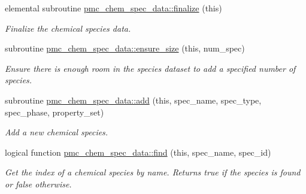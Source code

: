 \begin{DoxyCompactItemize}
elemental subroutine \mbox{\hyperlink{namespacepmc__chem__spec__data_ac14765515e7b7e1ed204998684e5412e}{pmc\+\_\+chem\+\_\+spec\+\_\+data\+::finalize}} (this)
\begin{DoxyCompactList}\small\item\em Finalize the chemical species data. \end{DoxyCompactList}\item 
subroutine \mbox{\hyperlink{namespacepmc__chem__spec__data_aee2a5f3c45a7fd6b4e51a7286022379d}{pmc\+\_\+chem\+\_\+spec\+\_\+data\+::ensure\+\_\+size}} (this, num\+\_\+spec)
\begin{DoxyCompactList}\small\item\em Ensure there is enough room in the species dataset to add a specified number of species. \end{DoxyCompactList}\item 
subroutine \mbox{\hyperlink{namespacepmc__chem__spec__data_a09de56593d91886a82053ee6052bce52}{pmc\+\_\+chem\+\_\+spec\+\_\+data\+::add}} (this, spec\+\_\+name, spec\+\_\+type, spec\+\_\+phase, property\+\_\+set)
\begin{DoxyCompactList}\small\item\em Add a new chemical species. \end{DoxyCompactList}\item 
logical function \mbox{\hyperlink{namespacepmc__chem__spec__data_a94efcf0206ad02470c47712887ab0eaa}{pmc\+\_\+chem\+\_\+spec\+\_\+data\+::find}} (this, spec\+\_\+name, spec\+\_\+id)
\begin{DoxyCompactList}\small\item\em Get the index of a chemical species by name. Returns true if the species is found or false otherwise. \end{DoxyCompactList}\end{DoxyCompactItemize}
